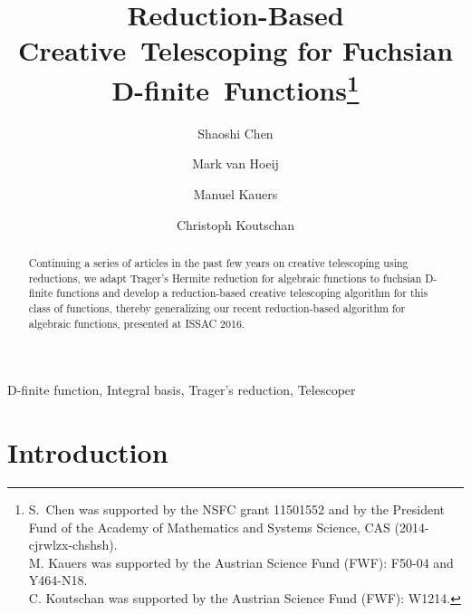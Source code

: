 \documentclass[final,1p,times,authoryear]{elsarticle}
\begin{document}
\begin{frontmatter}

  \title{Reduction-Based Creative~Telescoping for Fuchsian D-finite~Functions\footnote{S.\ Chen was supported by the NSFC grant
11501552 and by the President Fund of the Academy of
Mathematics and Systems Science, CAS (2014-cjrwlzx-chshsh).\\
M. Kauers was supported by the Austrian Science Fund (FWF): F50-04 and Y464-N18.\\
C. Koutschan was supported by the Austrian Science Fund (FWF): W1214.
}}

  \author{Shaoshi Chen}
  \address{KLMM,\, AMSS, \,Chinese Academy of Sciences, Beijing, 100190, (China)}

  \author{Mark van Hoeij}
  \address{Department of Mathematics,  Florida State University, FL 32306-4510, (USA)}

  \author{Manuel Kauers}
  \address{Institute for Algebra, Johannes Kepler University, Altenberger Stra\ss e 69, A-4040 Linz, (Austria)}

  \author{Christoph Koutschan}
  \address{RICAM, Austrian Academy of Sciences, Altenberger Stra\ss e 69, A-4040 Linz, (Austria)}
  
\begin{abstract}
  Continuing a series of articles in the past few years on creative telescoping using reductions,
  we adapt Trager's Hermite reduction for algebraic functions to fuchsian D-finite functions and
  develop a reduction-based creative telescoping algorithm for this class of functions, thereby
  generalizing our recent reduction-based algorithm for algebraic functions, presented at ISSAC 2016.
\end{abstract}

\begin{keyword}
  D-finite function,
  Integral basis,
  Trager's reduction,
  Telescoper
\end{keyword}
\end{frontmatter}

\section{Introduction}\label{SECT:intro}
\end{document}
